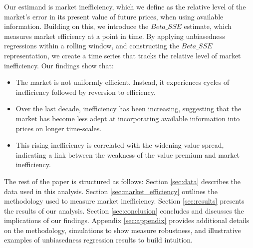 Our estimand is market inefficiency, which we define as the relative level of the market's error in its present value of future prices, when using available information.
Building on this, we introduce the \textit{$Beta\_SSE$} estimate, which measures market efficiency at a point in time. 
By applying unbiasedness regressions within a rolling window, and constructing the \textit{$Beta\_SSE$} representation, we create a time series that tracks the relative level of market 
inefficiency. \newline
\newline
Our findings show that:
\begin{itemize}
    \item The market is not uniformly efficient. Instead, it experiences cycles of inefficiency followed by reversion to efficiency.
    \item Over the last decade, inefficiency has been increasing, suggesting that the market has become less adept at incorporating available information into prices on longer time-scales.
    \item This rising inefficiency is correlated with the widening value spread, indicating a link between the weakness of the value premium and market inefficiency.
\end{itemize}

The rest of the paper is structured as follows: Section \ref{sec:data} describes the data used in this analysis. Section \ref{sec:market_efficiency} outlines the methodology used to measure market inefficiency.
Section \ref{sec:results} presents the results of our analysis. Section \ref{sec:conclusion} concludes and discusses the implications of our findings. 
Appendix \ref{sec:appendix} provides additional details on the methodology, simulations to show measure robustness, and illustrative examples of unbiasedness regression results
to build intuition.